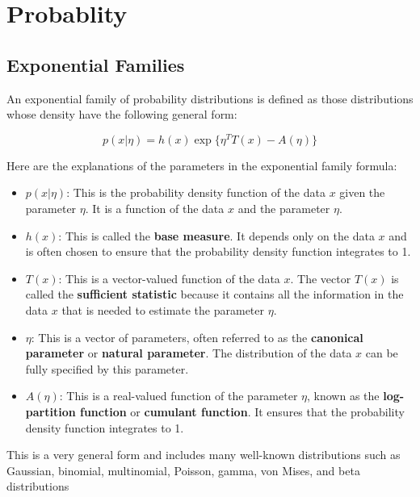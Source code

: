 \documentclass[11pt,singleside,openright]{report}
\begin{document}

\chapter{Probablity}
\section{Exponential Families}
An exponential family of probability distributions is defined as those distributions whose density have the following general form:

$$
p(x | \eta) = h(x) \exp\{\eta^T T (x) - A(\eta)\}
$$

Here are the explanations of the parameters in the exponential family formula:

\begin{itemize}
    \item $p(x | \eta)$: This is the probability density function of the data $x$ given the parameter $\eta$. It is a function of the data $x$ and the parameter $\eta$.

    \item $h(x)$: This is called the \textbf{base measure}. It depends only on the data $x$ and is often chosen to ensure that the probability density function integrates to 1.

    \item $T(x)$: This is a vector-valued function of the data $x$. The vector $T(x)$ is called the \textbf{sufficient statistic} because it contains all the information in the data $x$ that is needed to estimate the parameter $\eta$.

    \item $\eta$: This is a vector of parameters, often referred to as the \textbf{canonical parameter} or \textbf{natural parameter}. The distribution of the data $x$ can be fully specified by this parameter.

    \item $A(\eta)$: This is a real-valued function of the parameter $\eta$, known as the \textbf{log-partition function} or \textbf{cumulant function}. It ensures that the probability density function integrates to 1.
\end{itemize}

This is a very general form and includes many well-known distributions such as Gaussian, binomial, multinomial, Poisson, gamma, von Mises, and beta distributions





\end{document}
